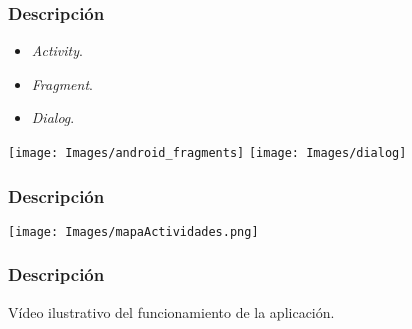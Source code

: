 \begin{frame}
	\frametitle{Descripción}
		\begin{itemize}
			\item {\it Activity}.
			\item {\it Fragment}.
			\item {\it Dialog}.
		\end{itemize}
	\endblock{}
	
	{\inserttitlegraphic\par}
	\vfill \texttt{[image: Images/android\_fragments]}
	\hfill \texttt{[image: Images/dialog]}
	
\end{frame}


\begin{frame}
	\frametitle{Descripción}
	\begin{center}
		\texttt{[image: Images/mapaActividades.png]}
	\end{center}
\end{frame}


\begin{frame}
	\frametitle{Descripción}
	\block{}
		Vídeo ilustrativo del funcionamiento de la aplicación.
	\endblock{}
\end{frame}